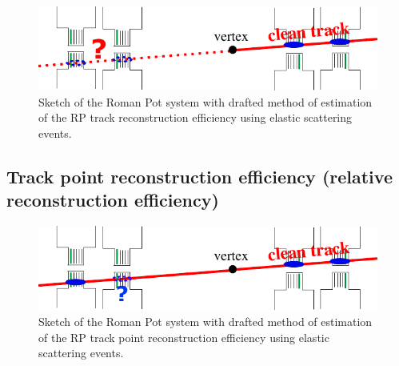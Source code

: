 \begin{figure}[t!]%
	\centering
	\parbox{0.65\textwidth}{%
		\centering%
		\includegraphics[width=\linewidth]{graphics/systematicsEfficiency/RpSyst/effCalculationScheme.pdf}%
	} 
	\quad
	\parbox{0.31\textwidth}{ 
		\centering
			\caption[Draft of the method of estimation of the RP track reconstruction efficiency for systematic uncertainty determination.]%
			{Sketch of the Roman Pot system with drafted method of estimation of the RP track reconstruction efficiency using elastic scattering events.}\label{fig:sketchRpTrackEffSyst}%
	}
	
\end{figure}

\subsection{Track point reconstruction efficiency (relative reconstruction efficiency)}

\begin{figure}[h]%
	\centering
	\parbox{0.65\textwidth}{%
		\centering%
		\includegraphics[width=\linewidth]{graphics/systematicsEfficiency/RpSyst/effCalculationScheme_2.pdf}%
	} 
	\quad
	\parbox{0.31\textwidth}{ 
		\centering
			\caption[Draft of the method of estimation of the RP track point reconstruction efficiency for systematic uncertainty determination.]%
			{Sketch of the Roman Pot system with drafted method of estimation of the RP track point reconstruction efficiency using elastic scattering events.}\label{fig:sketchRpTrackPointEffSyst}%
	}
	
\end{figure}
